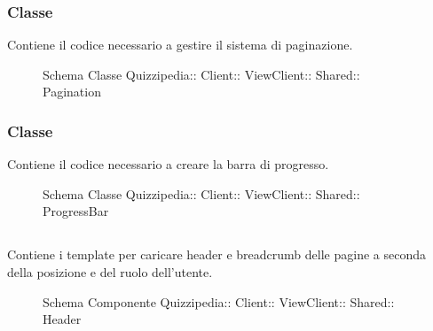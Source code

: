 \subsubsection{Classe }
Contiene il codice necessario a gestire il sistema di paginazione.
\begin{figure}[H]
\centering
\noindent{}
\caption[Schema Classe Pagination]{Schema Classe Quizzipedia:: Client:: ViewClient:: Shared:: Pagination}
\end{figure}
\subsubsection{Classe }
Contiene il codice necessario a creare la barra di progresso.
\begin{figure}[H]
\centering
\noindent{}
\caption[Schema Classe ProgressBar]{Schema Classe Quizzipedia:: Client:: ViewClient:: Shared:: ProgressBar}
\end{figure}
\subsection{}
Contiene i template per caricare header e breadcrumb delle pagine a seconda della posizione e del ruolo dell'utente.
\begin{figure}[H]
\centering
\noindent{}
\caption[Schema Componente Header]{Schema Componente Quizzipedia:: Client:: ViewClient:: Shared:: Header}
\end{figure}
